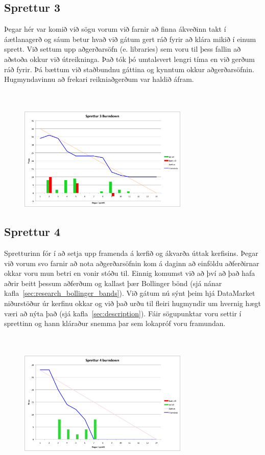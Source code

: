 \documentclass{article}
\begin{document}
\subsection{Sprettur 3}
Þegar hér var komið við sögu vorum við farnir að finna ákveðinn takt í
áætlanagerð og sáum betur hvað við gátum gert ráð fyrir að klára mikið 
í einum sprett. Við settum upp aðgerðarsöfn (e. libraries) sem voru til þess fallin að
aðstoða okkur við útreikninga. Það tók þó umtalsvert lengri tíma en við gerðum
ráð fyrir. Þá bættum við staðbundnu gáttina og kynntum okkur aðgerðarsöfnin.
Hugmyndavinnu að frekari reikniaðgerðum var haldið áfram.
\hfil \\
\hfil \\
\hfil \\
\begin{figure}[H]
 \centering
 \includegraphics[width=0.72\textwidth]{Sprettur3_Burndown.png}
 \caption{}
\end{figure}
\label{fig:sp3}
\newpage
\subsection{Sprettur 4}
Spretturinn fór í að setja upp framenda á kerfið og ákvarða úttak kerfisins. 
Þegar við vorum svo farnir að nota aðgerðarsöfnin 
kom á daginn að einföldu aðferðirnar okkar voru mun betri en vonir stóðu til.
Einnig komumst við að því að það hafa aðrir beitt þessum aðferðum 
og kallast þær Bollinger bönd (sjá nánar kafla~\ref{sec:research_bollinger_bands}). 
Við gátum nú sýnt þeim hjá DataMarket niðurstöður úr kerfinu okkar og við það
urðu til fleiri hugmyndir um hvernig hægt væri að nýta það (sjá kafla~\ref{sec:description}).
Fáir sögupunktar voru settir í sprettinn og hann kláraður snemma þar sem lokapróf voru framundan.
\hfil \\
\hfil \\
\hfil \\
\begin{figure}[H]
 \centering
 \includegraphics[width=0.72\textwidth]{Sprettur4_Burndown.png}
 \caption{}
\label{fig:sp4}
\end{figure}
\newpage
\end{document}
